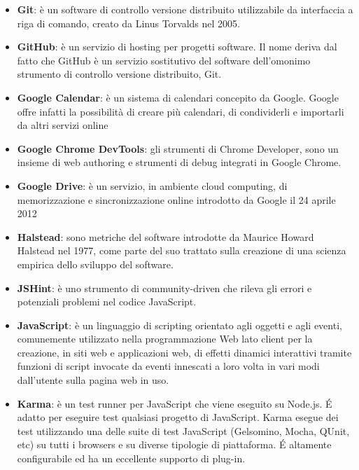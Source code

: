 \begin{itemize}
\item[] \textbf{Git}: è un software di controllo versione distribuito utilizzabile da interfaccia a riga di comando, creato da Linus Torvalds nel 2005.
\item[] \textbf{GitHub}: è un servizio di hosting per progetti software. Il nome deriva dal fatto che GitHub è un servizio sostitutivo del software dell'omonimo strumento di controllo versione distribuito, Git.
\item[] \textbf{Google Calendar}: è un sistema di calendari concepito da Google. Google offre infatti la possibilità di creare più calendari, di condividerli e importarli da altri servizi online
\item[] \textbf{Google Chrome DevTools}: gli strumenti di Chrome Developer, sono un insieme di web authoring e strumenti di debug integrati in Google Chrome.
\item[] \textbf{Google Drive}: è un servizio, in ambiente cloud computing, di memorizzazione e sincronizzazione online introdotto da Google il 24 aprile 2012
\end{itemize}
\newpage

\begin{itemize}
\item[] \textbf{Halstead}: sono metriche del software introdotte da Maurice Howard Halstead nel 1977, come parte del suo trattato sulla creazione di una scienza empirica dello sviluppo del software.
\end{itemize}
\newpage

\begin{itemize}
\item[] \textbf{JSHint}: è uno strumento di community-driven che rileva gli errori e potenziali problemi nel codice JavaScript.
\item[] \textbf{JavaScript}: è un linguaggio di scripting orientato agli oggetti e agli eventi, comunemente utilizzato nella programmazione Web lato client per la creazione, in siti web e applicazioni web, di effetti dinamici interattivi tramite funzioni di script invocate da eventi innescati a loro volta in vari modi dall'utente sulla pagina web in uso.
\end{itemize}
\newpage

\begin{itemize}
\item[] \textbf{Karma}: è un test runner per JavaScript che viene eseguito su Node.js. \'E adatto per eseguire test qualsiasi progetto di JavaScript. Karma esegue dei test utilizzando una delle suite di test JavaScript (Gelsomino, Mocha, QUnit, etc) su tutti i browsers e su diverse tipologie di piattaforma. É altamente configurabile ed ha un eccellente supporto di plug-in.
\end{itemize}
\newpage

